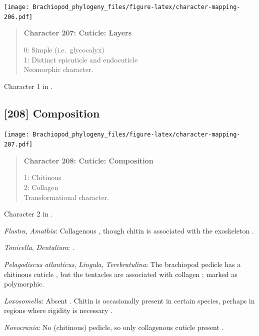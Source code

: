 \documentclass[openany]{book}
\begin{document}
\texttt{[image: Brachiopod\_phylogeny\_files/figure-latex/character-mapping-206.pdf]}

\begin{quote}
\textbf{Character 207: Cuticle: Layers}

0: Simple (i.e.~glycocalyx)\\
1: Distinct epicuticle and endocuticle\\
Neomorphic character.
\end{quote}

Character 1 in \citet{Haszprunar1996}.

\subsection*{{[}208{]} Composition}\label{composition-1}

\texttt{[image: Brachiopod\_phylogeny\_files/figure-latex/character-mapping-207.pdf]}

\begin{quote}
\textbf{Character 208: Cuticle: Composition}

1: Chitinous\\
2: Collagen\\
Transformational character.
\end{quote}

Character 2 in \citet{Haszprunar2008}.

\hypertarget{Amathia-coding-208}{}
\emph{Flustra}, \emph{Amathia}: Collagenous \citep{Schopf1967}, though
chitin is associated with the exoskeleton \citep{Hunt1972}.

\hypertarget{Dentalium-coding-208}{}
\emph{Tonicella}, \emph{Dentalium}: \citet{Haszprunar2008}.

\hypertarget{Lingula-coding-208}{}
\emph{Pelagodiscus atlanticus}, \emph{Lingula}, \emph{Terebratulina}:
The brachiopod pedicle has a chitinous cuticle
\citep{Williams1997Introduction, MacKay1978}, but the tentacles are
associated with collagen \citep{Williams1997Introduction}; marked as
polymorphic.

\hypertarget{Loxosomella-coding-208}{}
\emph{Loxosomella}: Absent \citep{Haszprunar2008}. Chitin is
occasionally present in certain species, perhaps in regions where
rigidity is necessary \citep{Borisanova2015}.

\hypertarget{Novocrania-coding-208}{}
\emph{Novocrania}: No (chitinous) pedicle, so only collagenous cuticle
present \citep{Williams1997Introduction}.
\end{document}
